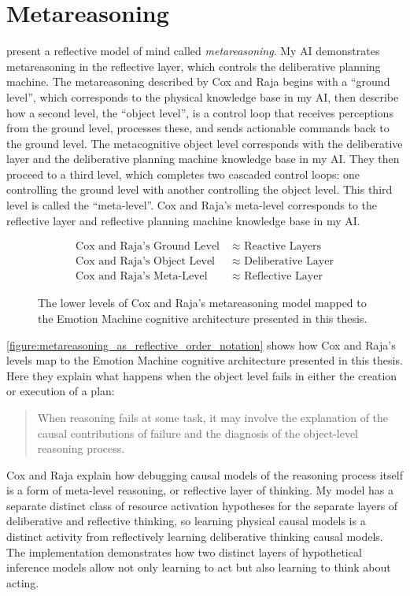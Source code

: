 \section{Metareasoning}

\cite{cox_and_raja:2008,cox:2010} present a reflective model of mind
called \emph{metareasoning}.  My AI demonstrates metareasoning in the
reflective layer, which controls the deliberative planning machine.
The metareasoning described by Cox and Raja begins with a ``ground
level'', which corresponds to the physical knowledge base in my AI,
then describe how a second level, the ``object level'', is a control
loop that receives perceptions from the ground level, processes these,
and sends actionable commands back to the ground level.  The
metacognitive object level corresponds with the deliberative layer and
the deliberative planning machine knowledge base in my AI.  They then
proceed to a third level, which completes two cascaded control loops:
one controlling the ground level with another controlling the object
level.  This third level is called the ``meta-level''.  Cox and Raja's
meta-level corresponds to the reflective layer and reflective planning
machine knowledge base in my AI.
\begin{figure}[bth]
\begin{align*}
\text{Cox and Raja's Ground Level } &{\approx} \text{ Reactive Layers} \\
\text{Cox and Raja's Object Level } &{\approx} \text{ Deliberative Layer} \\
\text{Cox and Raja's Meta-Level }   &{\approx} \text{ Reflective Layer}
\end{align*}
\caption{The lower levels of Cox and Raja's metareasoning model mapped
  to the Emotion Machine cognitive architecture presented in this
  thesis.}
\label{figure:metareasoning_as_reflective_order_notation}
\end{figure}
\autoref{figure:metareasoning_as_reflective_order_notation} shows how
Cox and Raja's levels map to the Emotion Machine cognitive
architecture presented in this thesis.  Here they explain what happens
when the object level fails in either the creation or execution of a
plan:
\begin{quote}
When reasoning fails at some task, it may involve the explanation of
the causal contributions of failure and the diagnosis of the
object-level reasoning process.
\end{quote}
Cox and Raja explain how debugging causal models of the reasoning
process itself is a form of meta-level reasoning, or reflective layer
of thinking.  My model has a separate distinct class of resource
activation hypotheses for the separate layers of deliberative and
reflective thinking, so learning physical causal models is a distinct
activity from reflectively learning deliberative thinking causal
models.  The implementation demonstrates how two distinct layers of
hypothetical inference models allow not only learning to act but also
learning to think about acting.

